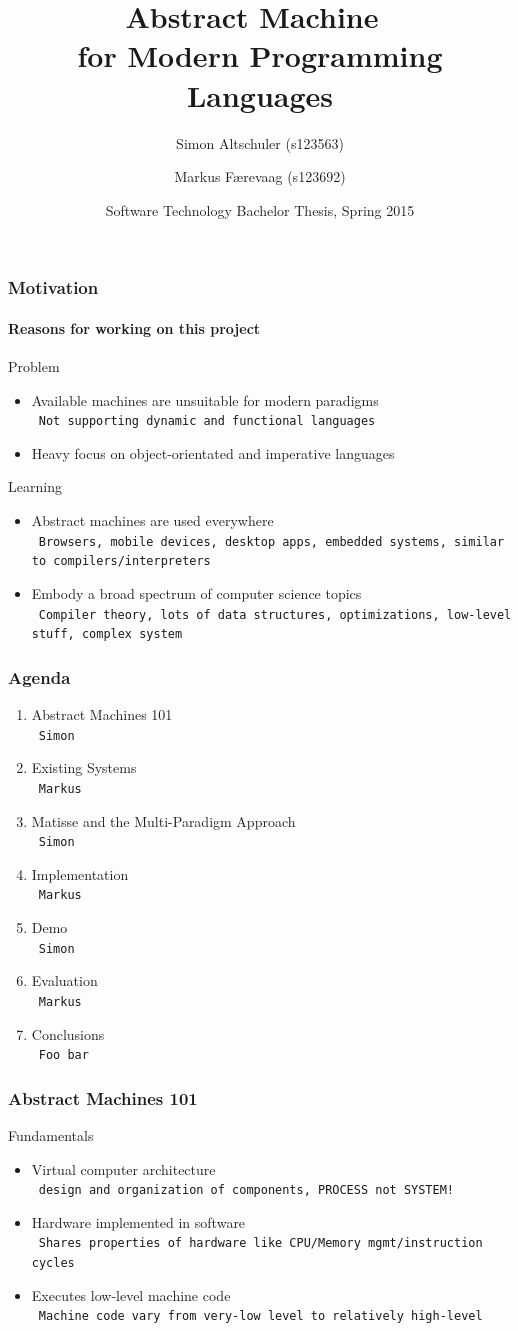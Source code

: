 \documentclass{beamer}
\title{Abstract Machine~\\for Modern Programming Languages}
\author[Altschuler, Færevaag]{Simon Altschuler (s123563) \and Markus Færevaag (s123692)}
\date{Software Technology Bachelor Thesis, Spring 2015}
\newcommand{\n}[1]{\leavevmode\\~\texttt{\color{red}\tiny #1}}
\begin{document}
\frame{\titlepage}

\begin{frame}
  \frametitle{Motivation}
  \framesubtitle{Reasons for working on this project}

  Problem
  \begin{itemize}
  \item Available machines are unsuitable for modern paradigms
    \n{Not supporting dynamic and functional languages}
  \item Heavy focus on object-orientated and imperative languages
  \end{itemize}

  \pause{}

  \vspace{20pt}
  Learning
  \begin{itemize}
  \item Abstract machines are used everywhere
    \n{Browsers, mobile devices, desktop apps, embedded systems, similar to compilers/interpreters}
  \item Embody a broad spectrum of computer science topics
    \n{Compiler theory, lots of data structures, optimizations, low-level stuff, complex system}
  \end{itemize}

\end{frame}

\begin{frame}
  \frametitle{Agenda}
  \fontsize{11pt}{20}\selectfont
  \begin{enumerate}
  \item Abstract Machines 101
    \n{Simon}
  \item Existing Systems
    \n{Markus}
  \item Matisse and the Multi-Paradigm Approach
    \n{Simon}
  \item Implementation
    \n{Markus}
  \item Demo
    \n{Simon}
  \item Evaluation
    \n{Markus}
  \item Conclusions
    \n{Foo bar}
  \end{enumerate}
\end{frame}

\begin{frame}
  \frametitle{Abstract Machines 101}

  Fundamentals

  \begin{itemize}[<+->]
  \item Virtual computer architecture
    \n{design and organization of components, PROCESS not SYSTEM!}
  \item Hardware implemented in software
    \n{Shares properties of hardware like CPU/Memory mgmt/instruction cycles}
  \item Executes low-level machine code
    \n{Machine code vary from very-low level to relatively high-level}
  \end{itemize}

\end{frame}
\end{document}
